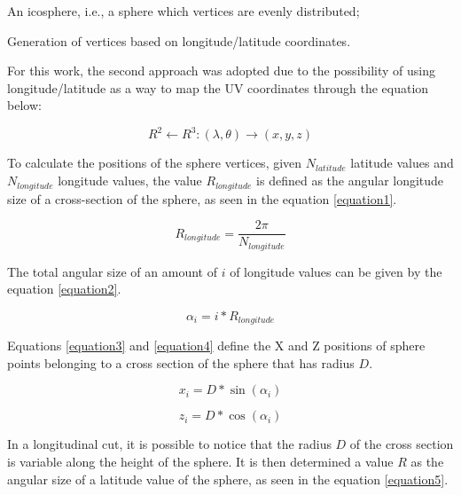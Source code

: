 \documentclass[runningheads]{llncs}
\begin{document}
\begin{enumerate}
  \begin{item} An icosphere, i.e., a sphere which vertices are evenly distributed;
 \end{item}
  \begin{item} Generation of vertices based on longitude/latitude coordinates. \end{item}
\end{enumerate}

For this work, the second approach was adopted due to the possibility of using longitude/latitude as a way to map the UV coordinates through the equation below:

\begin{equation}
R^2 \leftarrow R^3 : (\lambda, \theta) \rightarrow (x, y, z)
\label{equation1}
\end{equation}

To calculate the positions of the sphere vertices, given $N_{latitude}$ latitude values  and $N_{longitude}$ longitude values, the value $R_{longitude}$ is defined as the angular longitude size of a cross-section of the sphere, as seen in the equation \ref{equation1}.

\begin{equation}
R_{longitude} = \frac{2 \pi}{N_{longitude}}
\label{equation1}
\end{equation}

The total angular size of an amount of $i$ of longitude values can be given by the equation \ref{equation2}.

\begin{equation}
\alpha_{i} = i * R_{longitude}
\label{equation2}
\end{equation}

Equations \ref{equation3} and \ref{equation4} define the X and Z positions of sphere points belonging to a cross section of the sphere that has radius $D$.

\begin{equation}
x_{i} = D * \sin(\alpha_{i})
\label{equation3}
\end{equation}

\begin{equation}
z_{i} = D * \cos(\alpha_{i})
\label{equation4}
\end{equation}

In a longitudinal cut, it is possible to notice that the radius $D$ of the cross section is variable along the height of the sphere. It is then determined a value $R$ as the angular size of a latitude value of the sphere, as seen in the equation \ref{equation5}.
\end{document}
